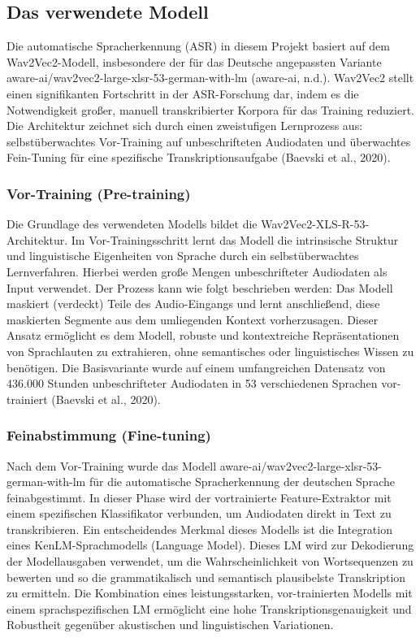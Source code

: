 \subsection{Das verwendete Modell}

Die automatische Spracherkennung (ASR) in diesem Projekt basiert auf dem Wav2Vec2-Modell, insbesondere der für das Deutsche angepassten Variante aware-ai/wav2vec2-large-xlsr-53-german-with-lm (aware-ai, n.d.). Wav2Vec2 stellt einen signifikanten Fortschritt in der ASR-Forschung dar, indem es die Notwendigkeit großer, manuell transkribierter Korpora für das Training reduziert. Die Architektur zeichnet sich durch einen zweistufigen Lernprozess aus: selbstüberwachtes Vor-Training auf unbeschrifteten Audiodaten und überwachtes Fein-Tuning für eine spezifische Transkriptionsaufgabe (Baevski et al., 2020).

\subsubsection{Vor-Training (Pre-training)}

Die Grundlage des verwendeten Modells bildet die Wav2Vec2-XLS-R-53-Architektur. Im Vor-Trainingsschritt lernt das Modell die intrinsische Struktur und linguistische Eigenheiten von Sprache durch ein selbstüberwachtes Lernverfahren. Hierbei werden große Mengen unbeschrifteter Audiodaten als Input verwendet. Der Prozess kann wie folgt beschrieben werden: Das Modell maskiert (verdeckt) Teile des Audio-Eingangs und lernt anschließend, diese maskierten Segmente aus dem umliegenden Kontext vorherzusagen. Dieser Ansatz ermöglicht es dem Modell, robuste und kontextreiche Repräsentationen von Sprachlauten zu extrahieren, ohne semantisches oder linguistisches Wissen zu benötigen. Die Basisvariante wurde auf einem umfangreichen Datensatz von 436.000 Stunden unbeschrifteter Audiodaten in 53 verschiedenen Sprachen vor-trainiert (Baevski et al., 2020).

\subsubsection{Feinabstimmung (Fine-tuning)}

Nach dem Vor-Training wurde das Modell aware-ai/wav2vec2-large-xlsr-53-german-with-lm für die automatische Spracherkennung der deutschen Sprache feinabgestimmt. In dieser Phase wird der vortrainierte Feature-Extraktor mit einem spezifischen Klassifikator verbunden, um Audiodaten direkt in Text zu transkribieren. Ein entscheidendes Merkmal dieses Modells ist die Integration eines KenLM-Sprachmodells (Language Model). Dieses LM wird zur Dekodierung der Modellausgaben verwendet, um die Wahrscheinlichkeit von Wortsequenzen zu bewerten und so die grammatikalisch und semantisch plausibelste Transkription zu ermitteln. Die Kombination eines leistungsstarken, vor-trainierten Modells mit einem sprachspezifischen LM ermöglicht eine hohe Transkriptionsgenauigkeit und Robustheit gegenüber akustischen und linguistischen Variationen.


